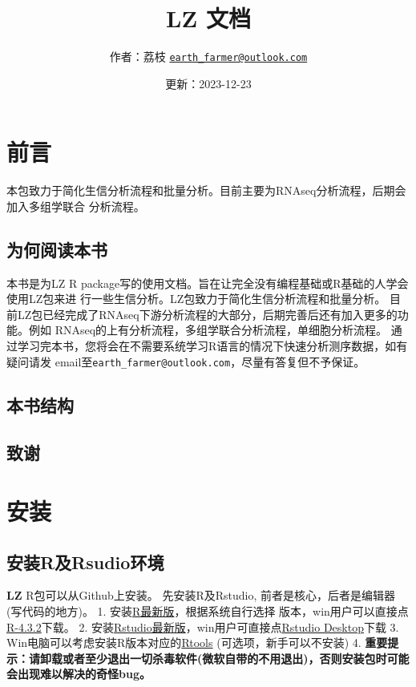\documentclass[
]{book}
\title{LZ 文档}
\author{作者：荔枝 \href{mailto:earth_farmer@outlook.com}{\nolinkurl{earth\_farmer@outlook.com}}}
\date{更新：2023-12-23}
\begin{document}
\maketitle

{
\setcounter{tocdepth}{1}
\tableofcontents
}
\chapter*{前言}\label{ux524dux8a00}

本包致力于简化生信分析流程和批量分析。目前主要为RNAseq分析流程，后期会加入多组学联合
分析流程。

\section*{为何阅读本书}\label{ux4e3aux4f55ux9605ux8bfbux672cux4e66}

本书是为LZ R package写的使用文档。旨在让完全没有编程基础或R基础的人学会使用LZ包来进
行一些生信分析。LZ包致力于简化生信分析流程和批量分析。
目前LZ包已经完成了RNAseq下游分析流程的大部分，后期完善后还有加入更多的功能。例如
RNAseq的上有分析流程，多组学联合分析流程，单细胞分析流程。
通过学习完本书，您将会在不需要系统学习R语言的情况下快速分析测序数据，如有疑问请发
email至\texttt{earth\_farmer@outlook.com}，尽量有答复但不予保证。

\section*{本书结构}\label{ux672cux4e66ux7ed3ux6784}

\section*{致谢}\label{ux81f4ux8c22}

\chapter{安装}\label{install}

\section{安装R及Rsudio环境}\label{ux5b89ux88c5rux53carsudioux73afux5883}

\textbf{LZ} R包可以从Github上安装。
先安装R及Rstudio, 前者是核心，后者是编辑器(写代码的地方)。
1. 安装\href{https://mirrors.tuna.tsinghua.edu.cn/CRAN/bin/}{R最新版}，根据系统自行选择
版本，win用户可以直接点\href{https://mirrors.tuna.tsinghua.edu.cn/CRAN/bin/windows/base/R-4.3.2-win.exe}{R-4.3.2}下载。
2. 安装\href{https://posit.co/download/rstudio-desktop/}{Rstudio最新版}，win用户可直接点\href{https://download1.rstudio.org/electron/windows/RStudio-2023.09.1-494.exe}{Rstudio Desktop}下载
3. Win电脑可以考虑安装R版本对应的\href{https://cran.r-project.org/bin/windows/Rtools/}{Rtools} (可选项，新手可以不安装)
4. \textbf{重要提示：请卸载或者至少退出一切杀毒软件(微软自带的不用退出)，否则安装包时可能会出现难以解决的奇怪bug。}
\end{document}

